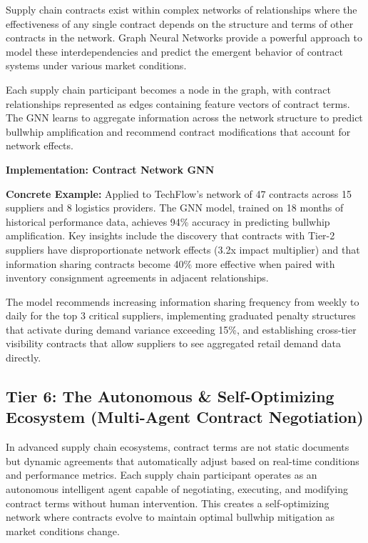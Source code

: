 \documentclass{article}
\begin{document}
Supply chain contracts exist within complex networks of relationships where the effectiveness of any single contract depends on the structure and terms of other contracts in the network. Graph Neural Networks provide a powerful approach to model these interdependencies and predict the emergent behavior of contract systems under various market conditions.

Each supply chain participant becomes a node in the graph, with contract relationships represented as edges containing feature vectors of contract terms. The GNN learns to aggregate information across the network structure to predict bullwhip amplification and recommend contract modifications that account for network effects.

\textbf{Implementation: Contract Network GNN}


\textbf{Concrete Example:} Applied to TechFlow's network of 47 contracts across 15 suppliers and 8 logistics providers. The GNN model, trained on 18 months of historical performance data, achieves 94\% accuracy in predicting bullwhip amplification. Key insights include the discovery that contracts with Tier-2 suppliers have disproportionate network effects (3.2x impact multiplier) and that information sharing contracts become 40\% more effective when paired with inventory consignment agreements in adjacent relationships.

The model recommends increasing information sharing frequency from weekly to daily for the top 3 critical suppliers, implementing graduated penalty structures that activate during demand variance exceeding 15\%, and establishing cross-tier visibility contracts that allow suppliers to see aggregated retail demand data directly.

\subsection{Tier 6: The Autonomous \& Self-Optimizing Ecosystem (Multi-Agent Contract Negotiation)}

In advanced supply chain ecosystems, contract terms are not static documents but dynamic agreements that automatically adjust based on real-time conditions and performance metrics. Each supply chain participant operates as an autonomous intelligent agent capable of negotiating, executing, and modifying contract terms without human intervention. This creates a self-optimizing network where contracts evolve to maintain optimal bullwhip mitigation as market conditions change.
\end{document}
